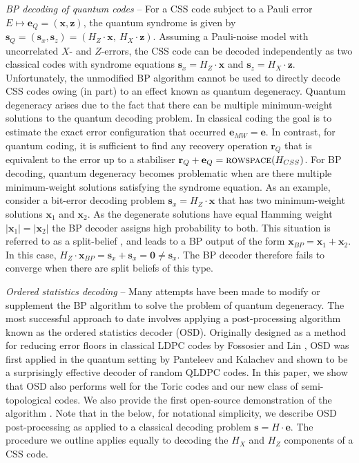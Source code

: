 \documentclass[%
 reprint,
superscriptaddress,
nofootinbib,
 amsmath,amssymb,
secnumarabic
]{revtex4-1}
\begin{document}
\textit{BP decoding of quantum codes} -- For a CSS code subject to a Pauli error $E\mapsto \mathbf{e}_Q=(\mathbf{x},\mathbf{z})$, the quantum syndrome is given by $\mathbf{s}_Q=(\mathbf{s}_x,\mathbf{s}_z)=(H_Z\cdot\mathbf{x} , \ H_X\cdot \mathbf{z})$. Assuming a Pauli-noise model with uncorrelated $X$- and $Z$-errors, the CSS code can be decoded independently as two classical codes with syndrome equations $\mathbf{s}_x=H_Z\cdot \mathbf{x}$ and $\mathbf{s}_z=H_X\cdot \mathbf{z}$. Unfortunately, the unmodified BP algorithm cannot be used to directly decode CSS codes owing (in part) to an effect known as quantum degeneracy. Quantum degeneracy arises due to the fact that there can be multiple minimum-weight solutions to the quantum decoding problem. In classical coding the goal is to estimate the exact error configuration that occurred $\mathbf{e}_{MW}=\mathbf{e}$. In contrast, for quantum coding, it is sufficient to find any recovery operation $\mathbf{r}_Q$ that is equivalent to the error up to a stabiliser $\mathbf{r}_Q + \mathbf{e}_Q = \text{\sc rowspace}(H_{CSS})$. For BP decoding, quantum degeneracy becomes problematic when are there multiple minimum-weight solutions satisfying the syndrome equation. As an example, consider a bit-error decoding problem $\mathbf{s}_x=H_Z\cdot \mathbf{x}$ that has two minimum-weight solutions $\mathbf{x}_1$ and $\mathbf{x}_2$. As the degenerate solutions have equal Hamming weight $|\mathbf{x}_1|=|\mathbf{x}_2|$ the BP decoder assigns high probability to both. This situation is referred to as a split-belief \cite{Criger18}, and leads to a BP output of the form $\mathbf{x}_{BP}=\mathbf{x}_1+\mathbf{x}_2$. In this case, $H_Z\cdot \mathbf{x}_{BP} = \mathbf{s}_x + \mathbf{s}_x= \mathbf{0} \neq \mathbf{s}_x$. The BP decoder therefore fails to converge when there are split beliefs of this type.


\textit{Ordered statistics decoding} -- Many attempts have been made to modify or supplement the BP algorithm to solve the problem of quantum degeneracy. The most successful approach to date involves applying a post-processing algorithm known as the ordered statistics decoder (OSD). Originally designed as a method for reducing error floors in classical LDPC codes by Fossosier and Lin \cite{Fossorier_1995}, OSD was first applied in the quantum setting by Panteleev and Kalachev \cite{Panteleev_2019} and shown to be a surprisingly effective decoder of random QLDPC codes.  In this paper, we show that OSD also performs well for the Toric codes and our new class of semi-topological codes. We also provide the first open-source demonstration of the algorithm \cite{bp_osd}. Note that in the below, for notational simplicity, we describe OSD post-processing as applied to a classical decoding problem $\mathbf{s}=H \cdot \mathbf{e}$. The procedure we outline applies equally to decoding the $H_X$ and $H_Z$ components of a CSS code.
\end{document}
